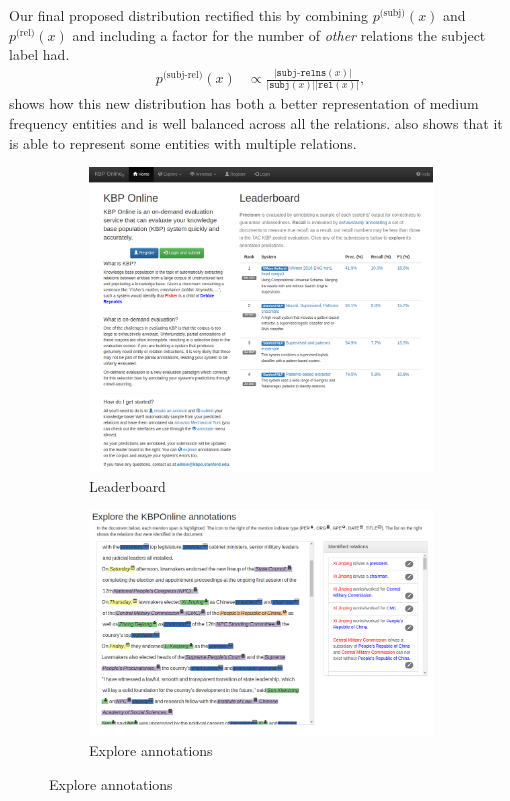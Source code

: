 Our final proposed distribution rectified this by combining $p^{\text{(subj)}}(x)$ and $p^{\text{(rel)}}(x)$ and including a factor for the number of \textit{other} relations the subject label had.
\begin{align*}
  p^{\text{(subj-rel)}}(x) &\propto \frac{|\texttt{subj-relns}(x)|}{|\texttt{subj}(x)| |\texttt{rel}(x)|},
\end{align*}
 shows how this new distribution has both a better representation of medium frequency entities and is well balanced across all the relations.
 also shows that it is able to represent some entities with multiple relations. 

\begin{figure}
  \centering
  \begin{subfigure}{0.8\textwidth}
    \includegraphics[width=\textwidth]{figures/interface/leaderboard}
    \caption{Leaderboard}
  \end{subfigure}

  \begin{subfigure}{0.8\textwidth}
    \includegraphics[width=\textwidth]{figures/interface/explore-data}
    \caption{Explore annotations}
  \end{subfigure}


\end{figure}
